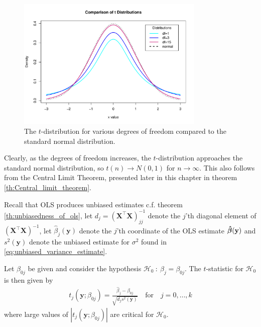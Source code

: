 \begin{figure}[H]
    \centering
    \includegraphics[width = 0.8\textwidth]{figures/t_distribution.pdf}
    \caption{The $t$-distribution for various degrees of freedom compared to the standard normal distribution.}
    \label{fig:t_distribution}
\end{figure}

Clearly, as the degrees of freedom increases, the $t$-distribution approaches the standard normal distribution, so $t(n) \rightarrow N(0,1)$ for $n\rightarrow \infty$. This also follows from the Central Limit Theorem, presented later in this chapter in theorem \ref{th:Central_limit_theorem}. 

Recall that OLS produces unbiased estimates c.f.$\!$ theorem \ref{th:unbiasedness_of_ols}, let $d_j=(\textbf{X}^\top\textbf{X})^{-1}_{jj}$ denote the $j$'th diagonal element of $(\textbf{X}^\top \textbf{X})^{-1}$, let $\hat{\beta}_j(\textbf{y})$ denote the $j$'th coordinate of the OLS estimate $\operatorname{\boldsymbol{\hat{\beta}}}(\textbf{y})$ and $s^2(\textbf{y})$ denote the unbiased estimate for $\sigma^2$ found in \eqref{eq:unbiased_variance_estimate}.

\begin{definition} [$t$-statistic] \label{def:t-test}
    Let $\beta_{0j}$ be given and consider the hypothesis $\mathcal{H}_0 \ : \ \beta_j=\beta_{0j}$. 
    The $t$-statistic for $\mathcal{H}_0$ is then given by
\begin{align}\label{eq:t_test1}
   t_j(\textbf{y};\beta_{0j}) = \frac{\hat{\beta}_j - \beta_{0j}}{\sqrt{d_j s^2(\textbf{y})}} \quad \text{for} \quad j=0,\ldots,k
\end{align}
where large values of $|t_j(\textbf{y};\beta_{0j})|$ are critical for $\mathcal{H}_0$.
\end{definition}

